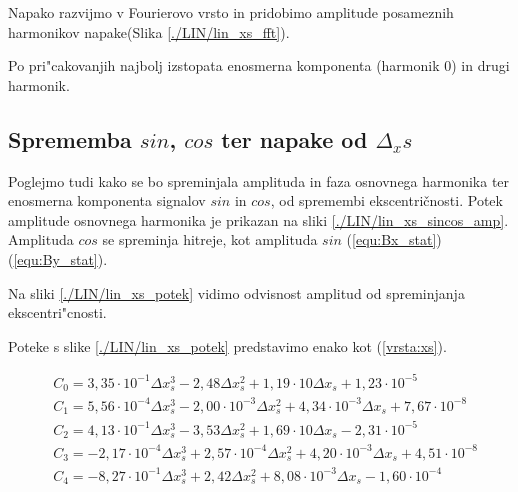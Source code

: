 
Napako razvijmo v Fourierovo vrsto in pridobimo amplitude posameznih harmonikov napake(Slika \ref{./LIN/lin_xs_fft}).

Po pri"cakovanjih najbolj izstopata enosmerna komponenta (harmonik 0) in drugi harmonik.


\subsection{Sprememba $sin$, $cos$ ter napake od $\Delta_xs$}

Poglejmo tudi kako se bo spreminjala amplituda in faza osnovnega harmonika ter enosmerna komponenta signalov $sin$ in $cos$, od spremembi ekscentričnosti. Potek amplitude  osnovnega harmonika je prikazan na sliki \ref{./LIN/lin_xs_sincos_amp}. Amplituda $cos$ se spreminja hitreje, kot amplituda $sin$ (\ref{equ:Bx_stat})(\ref{equ:By_stat}).



Na sliki \ref{./LIN/lin_xs_potek} vidimo odvisnost amplitud od spreminjanja ekscentri"cnosti.


Poteke s slike \ref{./LIN/lin_xs_potek} predstavimo enako kot (\ref{vrsta:xs}).

\begin{eqnarray}
&C_0 =3,35\cdot 10^{-1}\Delta x_s^{3}-2,48\Delta x_s^{2}+1,19\cdot 10\Delta x_s+1,23\cdot 10^{-5} \\
&C_1 =5,56\cdot 10^{-4}\Delta x_s^{3}-2,00\cdot 10^{-3}\Delta x_s^{2}+4,34\cdot 10^{-3}\Delta x_s+7,67\cdot 10^{-8} \\
&C_2 =4,13\cdot 10^{-1}\Delta x_s^{3}-3,53\Delta x_s^{2}+1,69\cdot 10\Delta x_s-2,31\cdot 10^{-5} \\
&C_3 =-2,17\cdot 10^{-4}\Delta x_s^{3}+2,57\cdot 10^{-4}\Delta x_s^{2}+4,20\cdot 10^{-3}\Delta x_s+4,51\cdot 10^{-8} \\
&C_4 =-8,27\cdot 10^{-1}\Delta x_s^{3}+2,42\Delta x_s^{2}+8,08\cdot 10^{-3}\Delta x_s-1,60\cdot 10^{-4}
\end{eqnarray}





